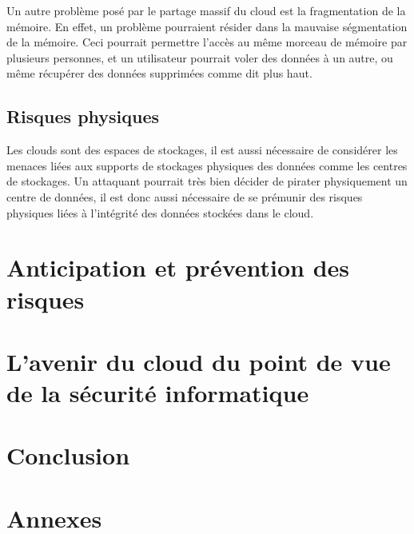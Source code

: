 \documentclass[a4paper, 12pt]{article}
\begin{document}
      Un autre problème posé par le partage massif du cloud est la fragmentation
      de la mémoire. En effet, un problème pourraient résider dans la mauvaise
      ségmentation de la mémoire. Ceci pourrait permettre l'accès au même
      morceau de mémoire par plusieurs personnes, et un utilisateur pourrait
      voler des données à un autre, ou même récupérer des données supprimées
      comme dit plus haut.

    \subsection{Risques physiques}
      Les clouds sont des espaces de stockages, il est aussi nécessaire de
      considérer les menaces liées aux supports de stockages physiques des
      données comme les centres de stockages. Un attaquant pourrait très bien
      décider de pirater physiquement un centre de données, il est donc aussi
      nécessaire de se prémunir des risques physiques liées à l'intégrité des
      données stockées dans le cloud.

  \section{Anticipation et prévention des risques}

  \section{L'avenir du cloud du point de vue de la sécurité informatique}

  \section{Conclusion}

  \section{Annexes}
\end{document}
